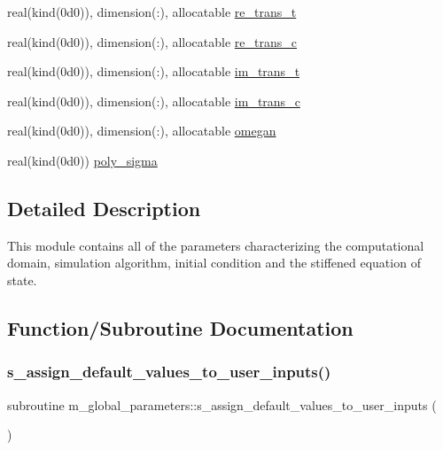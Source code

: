 \begin{Indent}
\begin{DoxyCompactItemize}
\item 
real(kind(0d0)), dimension(\+:), allocatable \hyperlink{namespacem__global__parameters_ae0e61a10cd5b33db394052fbefee2681}{re\+\_\+trans\+\_\+t}
\item 
real(kind(0d0)), dimension(\+:), allocatable \hyperlink{namespacem__global__parameters_a666c8f5f6663ab81f55c2298e642a3a9}{re\+\_\+trans\+\_\+c}
\item 
real(kind(0d0)), dimension(\+:), allocatable \hyperlink{namespacem__global__parameters_a62b213889b2dc5da7d81e7fa636231f6}{im\+\_\+trans\+\_\+t}
\item 
real(kind(0d0)), dimension(\+:), allocatable \hyperlink{namespacem__global__parameters_aa93addd83f0134aaaf319ca2b743233c}{im\+\_\+trans\+\_\+c}
\item 
real(kind(0d0)), dimension(\+:), allocatable \hyperlink{namespacem__global__parameters_ae152b49c742928bc52f6da61dd805693}{omegan}
\item 
real(kind(0d0)) \hyperlink{namespacem__global__parameters_a29164826db891e5662ce2bccdbc57d3c}{poly\+\_\+sigma}
\end{DoxyCompactItemize}
\end{Indent}


\subsection{Detailed Description}
This module contains all of the parameters characterizing the computational domain, simulation algorithm, initial condition and the stiffened equation of state. 

\subsection{Function/\+Subroutine Documentation}
\mbox{\label{namespacem__global__parameters_a433eac37597eb46a3cac84ca0471f5d3}} 
\subsubsection{\texorpdfstring{s\+\_\+assign\+\_\+default\+\_\+values\+\_\+to\+\_\+user\+\_\+inputs()}{s\_assign\_default\_values\_to\_user\_inputs()}}
{\footnotesize\ttfamily subroutine m\+\_\+global\+\_\+parameters\+::s\+\_\+assign\+\_\+default\+\_\+values\+\_\+to\+\_\+user\+\_\+inputs (\begin{DoxyParamCaption}{ }\end{DoxyParamCaption})}



